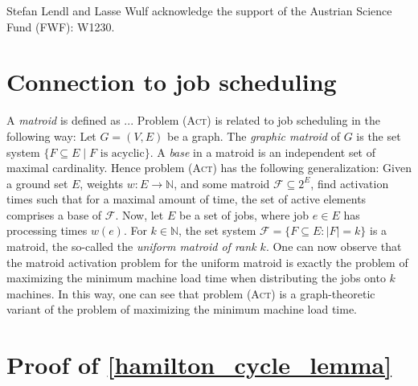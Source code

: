 \documentclass[runningheads]{llncs}
\numberwithin{equation}{section}
\newcommand{\N}{\mathbb{N}}
\newcommand{\set}[1]{\{ #1 \}}
\newcommand{\act}{\textsc{(Act)}}
\begin{document}
Stefan Lendl and Lasse Wulf acknowledge the support of the Austrian Science Fund (FWF):
W1230.

%
%





\appendix

\section{Connection to job scheduling}
\label{appendix:connection_act_job_scheduling}
A \emph{matroid} is defined as ...
Problem {\act} is related to job scheduling in the following way: Let $G = (V, E)$ be a graph. The \emph{graphic matroid} of $G$ is the set system $\set{F \subseteq E \mid F \text{ is acyclic}}$. A \emph{base} in a matroid is an independent set of maximal cardinality. Hence problem {\act} has the following generalization: Given a ground set $E$, weights $w: E \rightarrow \N$, and some matroid $\mathcal{F} \subseteq 2^E$, find activation times such that for a maximal amount of time, the set of active elements comprises a base of $\mathcal{F}$. Now, let $E$ be a set of jobs, where job $e \in E$ has processing times $w(e)$. For $k \in \N$, the set system $\mathcal{F} = \set{F \subseteq E : |F| = k}$ is a matroid, the so-called the \emph{uniform matroid of rank $k$}. One can now observe that the matroid activation problem for the uniform matroid is exactly the problem of maximizing the minimum machine load time when distributing the jobs onto $k$ machines. In this way, one can see that problem {\act} is a graph-theoretic variant of the problem of maximizing the minimum machine load time.

\section{Proof of \cref{hamilton_cycle_lemma}}

\label{appendix:hamilton_prime}
\hamiltonPrime*
\end{document}
